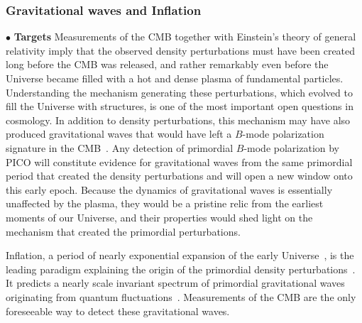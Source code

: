 \documentclass[PICOReport.tex]{subfiles}
\begin{document}
\subsubsection{Gravitational waves and Inflation}
\label{sec:inflation}

\noindent$\bullet$ {\bf Targets} \hspace{0.1in} Measurements of the \ac{CMB} together with Einstein's theory of general relativity imply that the observed density perturbations must have been created long before the \ac{CMB} was released, and rather remarkably even before the Universe became filled with a hot and dense plasma of fundamental particles. Understanding the mechanism generating these perturbations, which evolved to fill the Universe with structures, is one of the most important open questions in cosmology. In addition to density perturbations, this mechanism may have also produced gravitational waves that would have left a $B$-mode polarization signature in the CMB~\cite{Seljak:1996gy,Kamionkowski:1996zd}. 
Any detection of primordial $B$-mode polarization by PICO will constitute evidence for gravitational waves from the same primordial period that created the density perturbations and will open a new window onto this early epoch. Because the dynamics of gravitational waves is essentially unaffected by the plasma, they would be a pristine relic from the earliest moments of our Universe, and their properties would shed light on the mechanism that created the primordial perturbations. 

Inflation, a period of nearly exponential expansion of the early Universe~\cite{Guth:1980zm,Linde:1981mu,Albrecht:1982wi,Starobinsky:1980te}, is the leading paradigm explaining the origin of the primordial density perturbations~\cite{Mukhanov:1981xt,Guth:1982ec,Hawking:1982cz,Starobinsky:1982ee,Bardeen:1983qw}. It predicts a nearly scale invariant spectrum of primordial gravitational waves originating from quantum fluctuations~\cite{Starobinsky:1979ty}. 
Measurements of the \ac{CMB} are the only foreseeable way to detect these gravitational waves.

\end{document}
